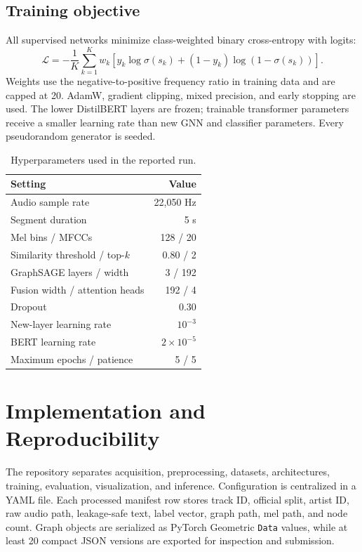 \IfFileExists{IEEEtran.cls}{\usingieeetrue\documentclass[conference]{IEEEtran}}{\usingieeefalse\documentclass[10pt,twocolumn]{article}}
\begin{document}
\subsection{Training objective}
All supervised networks minimize class-weighted binary cross-entropy with logits:
\begin{equation}
\mathcal{L}=-\frac{1}{K}\sum_{k=1}^{K}w_k[y_k\log\sigma(s_k)+(1-y_k)\log(1-\sigma(s_k))].
\end{equation}
Weights use the negative-to-positive frequency ratio in training data and are capped at 20. AdamW, gradient clipping, mixed precision, and early stopping are used. The lower DistilBERT layers are frozen; trainable transformer parameters receive a smaller learning rate than new GNN and classifier parameters. Every pseudorandom generator is seeded.

\begin{table}[t]
\caption{Hyperparameters used in the reported run.}
\centering
\begin{tabular}{lr}
\toprule
Setting & Value \\
\midrule
Audio sample rate & 22,050 Hz \\
Segment duration & 5 s \\
Mel bins / MFCCs & 128 / 20 \\
Similarity threshold / top-$k$ & 0.80 / 2 \\
GraphSAGE layers / width & 3 / 192 \\
Fusion width / attention heads & 192 / 4 \\
Dropout & 0.30 \\
New-layer learning rate & $10^{-3}$ \\
BERT learning rate & $2\times 10^{-5}$ \\
Maximum epochs / patience & 5 / 5 \\
\bottomrule
\end{tabular}
\label{tab:hyperparameters}
\end{table}

\section{Implementation and Reproducibility}
The repository separates acquisition, preprocessing, datasets, architectures, training, evaluation, visualization, and inference. Configuration is centralized in a YAML file. Each processed manifest row stores track ID, official split, artist ID, raw audio path, leakage-safe text, label vector, graph path, mel path, and node count. Graph objects are serialized as PyTorch Geometric \texttt{Data} values, while at least 20 compact JSON versions are exported for inspection and submission.
\end{document}
